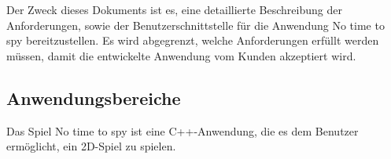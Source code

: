 Der Zweck dieses Dokuments ist es, eine detaillierte Beschreibung der Anforderungen, sowie der Benutzerschnittstelle
für die Anwendung No time to spy bereitzustellen. Es wird abgegrenzt, welche Anforderungen erfüllt werden müssen,
damit die entwickelte Anwendung vom Kunden akzeptiert wird.


\subsection{Anwendungsbereiche}
Das Spiel No time to spy ist eine C++-Anwendung, die es dem Benutzer ermöglicht, ein 2D-Spiel zu spielen.
